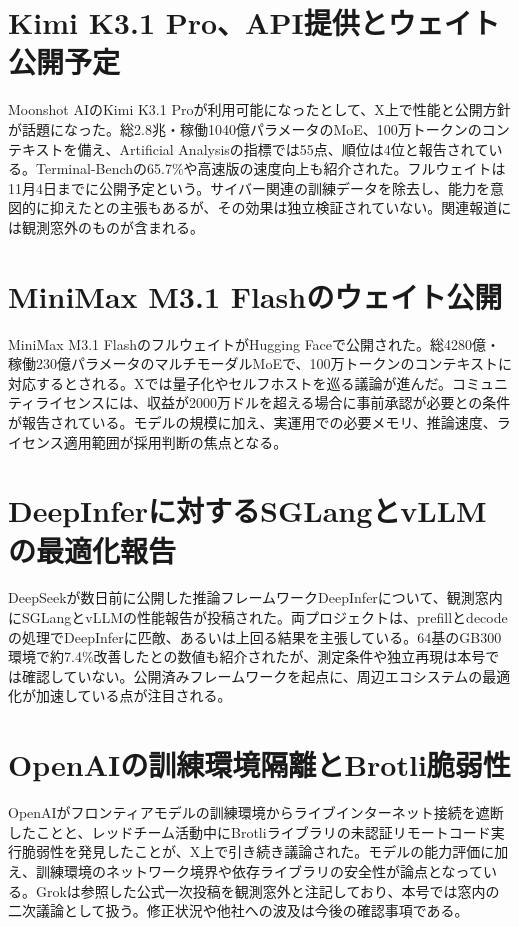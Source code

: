 \section{Kimi K3.1 Pro、API提供とウェイト公開予定}
Moonshot AIのKimi K3.1 Proが利用可能になったとして、X上で性能と公開方針が話題になった。総2.8兆・稼働1040億パラメータのMoE、100万トークンのコンテキストを備え、Artificial Analysisの指標では55点、順位は4位と報告されている。Terminal-Benchの65.7\%や高速版の速度向上も紹介された。フルウェイトは11月4日までに公開予定という。サイバー関連の訓練データを除去し、能力を意図的に抑えたとの主張もあるが、その効果は独立検証されていない。関連報道には観測窓外のものが含まれる。

\section{MiniMax M3.1 Flashのウェイト公開}
MiniMax M3.1 FlashのフルウェイトがHugging Faceで公開された。総4280億・稼働230億パラメータのマルチモーダルMoEで、100万トークンのコンテキストに対応するとされる。Xでは量子化やセルフホストを巡る議論が進んだ。コミュニティライセンスには、収益が2000万ドルを超える場合に事前承認が必要との条件が報告されている。モデルの規模に加え、実運用での必要メモリ、推論速度、ライセンス適用範囲が採用判断の焦点となる。

\section{DeepInferに対するSGLangとvLLMの最適化報告}
DeepSeekが数日前に公開した推論フレームワークDeepInferについて、観測窓内にSGLangとvLLMの性能報告が投稿された。両プロジェクトは、prefillとdecodeの処理でDeepInferに匹敵、あるいは上回る結果を主張している。64基のGB300環境で約7.4\%改善したとの数値も紹介されたが、測定条件や独立再現は本号では確認していない。公開済みフレームワークを起点に、周辺エコシステムの最適化が加速している点が注目される。

\section{OpenAIの訓練環境隔離とBrotli脆弱性}
OpenAIがフロンティアモデルの訓練環境からライブインターネット接続を遮断したことと、レッドチーム活動中にBrotliライブラリの未認証リモートコード実行脆弱性を発見したことが、X上で引き続き議論された。モデルの能力評価に加え、訓練環境のネットワーク境界や依存ライブラリの安全性が論点となっている。Grokは参照した公式一次投稿を観測窓外と注記しており、本号では窓内の二次議論として扱う。修正状況や他社への波及は今後の確認事項である。

